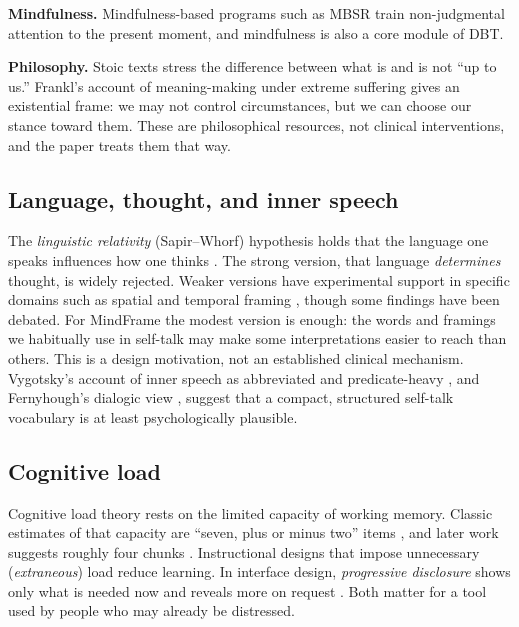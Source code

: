 \documentclass[11pt]{article}
\begin{document}
\textbf{Mindfulness.} Mindfulness-based programs such as MBSR \citep{kabatzinn1990} train non-judgmental attention to the present moment, and mindfulness is also a core module of DBT.

\textbf{Philosophy.} Stoic texts \citep{epictetus,marcus} stress the difference between what is and is not ``up to us.'' Frankl's account of meaning-making under extreme suffering \citep{frankl2006} gives an existential frame: we may not control circumstances, but we can choose our stance toward them. These are philosophical resources, not clinical interventions, and the paper treats them that way.

\subsection{Language, thought, and inner speech}
The \emph{linguistic relativity} (Sapir--Whorf) hypothesis holds that the language one speaks influences how one thinks \citep{whorf1956}. The strong version, that language \emph{determines} thought, is widely rejected. Weaker versions have experimental support in specific domains such as spatial and temporal framing \citep{boroditsky2001}, though some findings have been debated. For MindFrame the modest version is enough: the words and framings we habitually use in self-talk may make some interpretations easier to reach than others. This is a design motivation, not an established clinical mechanism. Vygotsky's account of inner speech as abbreviated and predicate-heavy \citep{vygotsky1986}, and Fernyhough's dialogic view \citep{fernyhough2016}, suggest that a compact, structured self-talk vocabulary is at least psychologically plausible.

\subsection{Cognitive load}
Cognitive load theory \citep{sweller1988} rests on the limited capacity of working memory. Classic estimates of that capacity are ``seven, plus or minus two'' items \citep{miller1956}, and later work suggests roughly four chunks \citep{cowan2001}. Instructional designs that impose unnecessary (\emph{extraneous}) load reduce learning. In interface design, \emph{progressive disclosure} shows only what is needed now and reveals more on request \citep{nielsen2006}. Both matter for a tool used by people who may already be distressed.
\end{document}
